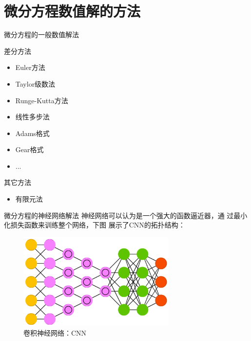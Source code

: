 \documentclass[hyperref,UTF8,11pt]{beamer}
\begin{document}
\section{微分方程数值解的方法}
\begin{frame}{微分方程的一般数值解法}
\begin{block}{差分方法}
    \begin{itemize}
        \item Euler方法
        \item Taylor级数法
		\item Runge-Kutta方法
		\item 线性多步法
		\item Adams格式
		\item Gear格式
		\item ...
    \end{itemize}
\end{block}
\begin{block}{其它方法}
    \begin{itemize}
        \item 有限元法
    \end{itemize}
\end{block}
\end{frame}
\begin{frame}{微分方程的神经网络解法}
神经网络可以认为是一个强大的函数逼近器，通
过最小化损失函数来训练整个网络，下图
展示了CNN的拓扑结构\cite{2016Deep}：
    \begin{figure}
        \centering
        \includegraphics[width=0.7\textwidth]{./pic/cnn.png}
        \caption{卷积神经网络：CNN}\label{fig:CNN}
    \end{figure}

\end{frame}
\end{document}
